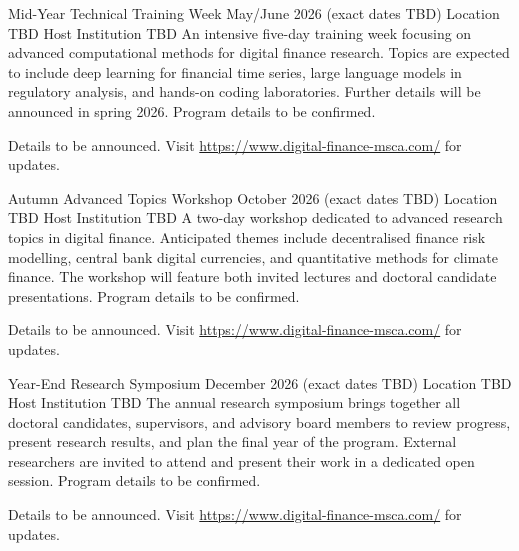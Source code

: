 \newpage
\eventpage
  {Mid-Year Technical Training Week}
  {May/June 2026 (exact dates TBD)}
  {Location TBD}
  {Host Institution TBD}
  {An intensive five-day training week focusing on advanced computational
   methods for digital finance research.  Topics are expected to include deep
   learning for financial time series, large language models in regulatory
   analysis, and hands-on coding laboratories.  Further details will be
   announced in spring 2026.}
  {Program details to be confirmed.}
  {}

\begin{tcolorbox}[colback=mscaLightGrey, colframe=mscaGrey, arc=2mm]
\centering\sffamily\large\color{mscaGrey}
Details to be announced.  Visit \url{https://www.digital-finance-msca.com/} for updates.
\end{tcolorbox}

\newpage
\eventpage
  {Autumn Advanced Topics Workshop}
  {October 2026 (exact dates TBD)}
  {Location TBD}
  {Host Institution TBD}
  {A two-day workshop dedicated to advanced research topics in digital
   finance.  Anticipated themes include decentralised finance risk modelling,
   central bank digital currencies, and quantitative methods for climate
   finance.  The workshop will feature both invited lectures and doctoral
   candidate presentations.}
  {Program details to be confirmed.}
  {}

\begin{tcolorbox}[colback=mscaLightGrey, colframe=mscaGrey, arc=2mm]
\centering\sffamily\large\color{mscaGrey}
Details to be announced.  Visit \url{https://www.digital-finance-msca.com/} for updates.
\end{tcolorbox}

\newpage
\eventpage
  {Year-End Research Symposium}
  {December 2026 (exact dates TBD)}
  {Location TBD}
  {Host Institution TBD}
  {The annual research symposium brings together all doctoral candidates,
   supervisors, and advisory board members to review progress, present
   research results, and plan the final year of the program.  External
   researchers are invited to attend and present their work in a dedicated
   open session.}
  {Program details to be confirmed.}
  {}

\begin{tcolorbox}[colback=mscaLightGrey, colframe=mscaGrey, arc=2mm]
\centering\sffamily\large\color{mscaGrey}
Details to be announced.  Visit \url{https://www.digital-finance-msca.com/} for updates.
\end{tcolorbox}

